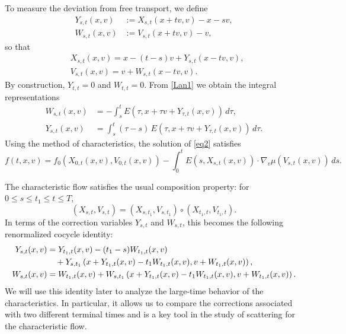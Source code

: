 \documentclass[reqno,11pt]{amsart}
\numberwithin{equation}{section}
\begin{document}
	To measure the deviation from free transport, we define
	\begin{equation}\label{Lan6}
		\begin{aligned}
			Y_{s,t}(x,v) &:= X_{s,t}(x+tv,v)-x-sv,\\
			W_{s,t}(x,v) &:= V_{s,t}(x+tv,v)-v,
		\end{aligned}
	\end{equation}
	so that
	\begin{align*}
		&X_{s,t}(x,v)=x-(t-s)v+ Y_{s,t}(x-tv,v),\\&
		V_{s,t}(x,v)=v+ W_{s,t}(x-tv,v).
	\end{align*}
	By construction, $Y_{t,t}=0$ and $W_{t,t}=0$. 
	From \eqref{Lan1} we obtain the integral representations
	\begin{equation}\label{definitionYW}
		\begin{aligned}
			W_{s,t}(x,v) &= -\int_s^t E(\tau,x+\tau v+Y_{\tau,t}(x,v))\,d\tau,\\
			Y_{s,t}(x,v) &= \int_s^t (\tau-s)\,E(\tau,x+\tau v+Y_{\tau,t}(x,v))\,d\tau.
		\end{aligned}
	\end{equation}
	Using the method of characteristics, the solution of \eqref{eq2} satisfies
	\begin{equation}\label{t1}
		f(t,x,v)
		= f_0(X_{0,t}(x,v),V_{0,t}(x,v))
		- \int_0^t E(s,X_{s,t}(x,v))\cdot\nabla_v\mu(V_{s,t}(x,v))\,ds .
	\end{equation}

	The characteristic flow satisfies the usual composition property: for
	$0\le s\le t_1\le t\le T$,
	\begin{equation}\label{flow-composition}
		(X_{s,t},V_{s,t})
		=
		(X_{s,t_1},V_{s,t_1})
		\circ
		(X_{t_1,t},V_{t_1,t}).
	\end{equation}
	In terms of the correction variables $Y_{s,t}$ and $W_{s,t}$, this becomes
	the following renormalized cocycle identity:
	\begin{align}
		Y_{s,t}(x,v)
		&=
		Y_{t_1,t}(x,v)
		-
		(t_1-s)W_{t_1,t}(x,v)
		\notag\\
		&\quad+
		Y_{s,t_1}
		\left(
		x+Y_{t_1,t}(x,v)-t_1W_{t_1,t}(x,v),
		v+W_{t_1,t}(x,v)
		\right),
		\label{a31}
		\\
		W_{s,t}(x,v)
		&=
		W_{t_1,t}(x,v)
		+
		W_{s,t_1}
		\left(
		x+Y_{t_1,t}(x,v)-t_1W_{t_1,t}(x,v),
		v+W_{t_1,t}(x,v)
		\right).
		\label{a32}
	\end{align}
	We will use this identity later to analyze the large-time behavior
	of the characteristics. In particular, it allows us to compare the
	corrections associated with two different terminal times and is a key tool in the
	study of scattering for the characteristic flow.
	
\end{document}
